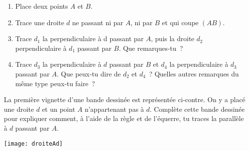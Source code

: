 
\begin{activite}

 \begin{partie}
 
  \begin{enumerate}
   \item Place deux points $A$ et $B$.
   \item Trace une droite $d$ ne passant ni par $A$, ni par $B$ et qui coupe $(AB)$.
   \item Trace $d_1$ la perpendiculaire à d passant par $A$, puis la droite $d_2$ perpendiculaire à $d_1$ passant par $B$. Que remarques‑tu ?
   \item Trace $d_3$ la perpendiculaire à $d$ passant par $B$ et $d_4$ la perpendiculaire à $d_3$ passant par $A$. Que peux‑tu dire de $d_2$ et $d_4$ ? Quelles autres remarques du même type peux‑tu faire ? 
   \end{enumerate}
   
  \end{partie} 

 \begin{partie}
 
 \begin{minipage}[c]{0.66\linewidth}
 La première vignette d'une bande dessinée est représentée ci‑contre. On y a placé une droite $d$ et un point $A$ n'appartenant pas à $d$.
 Complète cette bande dessinée pour expliquer comment, à l'aide de la règle et de l'équerre, tu traces la parallèle à $d$ passant par $A$.
  \end{minipage} \hfill %
 \begin{minipage}[c]{0.3\linewidth}
 \texttt{[image: droiteAd]}
  \end{minipage} \\
 
  \end{partie} 

\end{activite}


